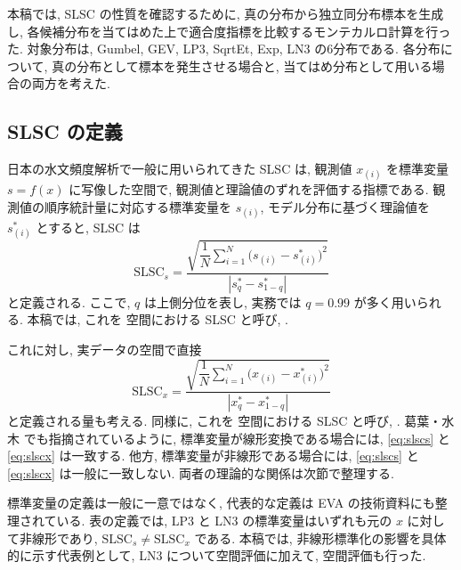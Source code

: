 本稿では, SLSC の性質を確認するために, 真の分布から独立同分布標本を生成し, 各候補分布を当てはめた上で適合度指標を比較するモンテカルロ計算を行った.
対象分布は, Gumbel, GEV, LP3, SqrtEt, Exp, LN3 の6分布である.
各分布について, 真の分布として標本を発生させる場合と, 当てはめ分布として用いる場合の両方を考えた.

\subsection{SLSC の定義}
日本の水文頻度解析で一般に用いられてきた SLSC は, 観測値 $x_{(i)}$ を標準変量 $s=f(x)$ に写像した空間で, 観測値と理論値のずれを評価する指標である.
観測値の順序統計量に対応する標準変量を $s_{(i)}$, モデル分布に基づく理論値を $s_{(i)}^{\ast}$ とすると, SLSC は
\begin{equation}
\mathrm{SLSC}_s
=
\frac{
\sqrt{\dfrac{1}{N}\sum_{i=1}^{N}\bigl(s_{(i)}-s_{(i)}^{\ast}\bigr)^2}
}{
\left|s_q^{\ast}-s_{1-q}^{\ast}\right|}
\label{eq:slscs}
\end{equation}
と定義される. ここで, $q$ は上側分位を表し, 実務では $q=0.99$ が多く用いられる.
本稿では, これを \Ssp 空間における SLSC と呼び, .

これに対し, 実データの空間で直接
\begin{equation}
\mathrm{SLSC}_x
=
\frac{
\sqrt{\dfrac{1}{N}\sum_{i=1}^{N}\bigl(x_{(i)}-x_{(i)}^{\ast}\bigr)^2}
}{
\left|x_q^{\ast}-x_{1-q}^{\ast}\right|}
\label{eq:slscx}
\end{equation}
と定義される量も考える.
同様に, これを \Xsp 空間における SLSC と呼び, .
葛葉・水木\cite{KuzuhaMizuki2022} でも指摘されているように, 標準変量が線形変換である場合には, \eqref{eq:slscs} と \eqref{eq:slscx} は一致する.
他方, 標準変量が非線形である場合には, \eqref{eq:slscs} と \eqref{eq:slscx} は一般に一致しない.
両者の理論的な関係は次節で整理する.

標準変量の定義は一般に一意ではなく, 代表的な定義は EVA の技術資料にも整理されている{\cite{DHI2022}}.
表の定義では,  LP3 と LN3 の標準変量はいずれも元の \(x\) に対して非線形であり,  \(\mathrm{SLSC}_s \neq \mathrm{SLSC}_x\) である.
本稿では, 非線形標準化の影響を具体的に示す代表例として, LN3 について\Ssp 空間評価に加えて, \Xsp 空間評価も行った.

